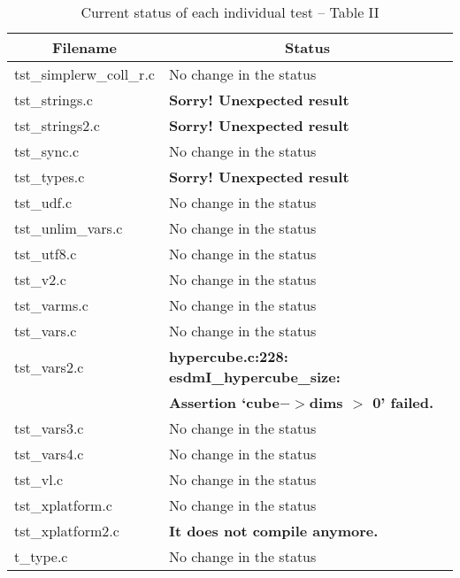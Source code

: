 \begin{table}[H]
\centering
\begin{tabular}{|l|l|}
\hline
\multicolumn{1}{|c|}{\parbox{4cm}{\centering Filename}} & \multicolumn{1}{c|}{Status} \\ \hline \hline
tst\_simplerw\_coll\_r.c &  No change in the status              \\ \hline
tst\_strings.c          &   \textbf{Sorry! Unexpected result}            \\ \hline
tst\_strings2.c         &   \textbf{Sorry! Unexpected result}            \\ \hline
tst\_sync.c             &   No change in the status            \\ \hline
tst\_types.c            &   \textbf{Sorry! Unexpected result}            \\ \hline
tst\_udf.c              &   No change in the status            \\ \hline
tst\_unlim\_vars.c      &   No change in the status            \\ \hline
tst\_utf8.c             &   No change in the status            \\ \hline
tst\_v2.c               &   No change in the status            \\ \hline
tst\_varms.c            &   No change in the status            \\ \hline
tst\_vars.c             &   No change in the status            \\ \hline
tst\_vars2.c            &   \textbf{hypercube.c:228: esdmI\_hypercube\_size:} \\
& \textbf{Assertion `cube$->$dims $>$ 0' failed.}            \\ \hline
tst\_vars3.c            &   No change in the status            \\ \hline
tst\_vars4.c            &   No change in the status            \\ \hline
tst\_vl.c               &   No change in the status            \\ \hline
tst\_xplatform.c        &   No change in the status            \\ \hline
tst\_xplatform2.c       &   \textbf{It does not compile anymore.}       \\ \hline
t\_type.c               &   No change in the status            \\ \hline
\hline
\end{tabular}
\caption{\label{tab:nc_test4_status_31} Current status of each individual test -- Table II}
\end{table}

\clearpage